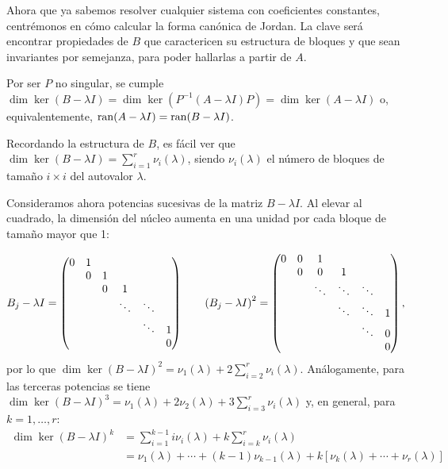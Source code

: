 \documentclass[../ecuaciones_diferenciales.tex]{subfiles}
\begin{document}
Ahora que ya sabemos resolver cualquier sistema con coeficientes constantes,
centrémonos en cómo calcular la forma canónica de Jordan. La clave será
encontrar propiedades de \(B\) que caractericen su estructura de bloques y que
sean invariantes por semejanza, para poder hallarlas a partir de \(A\).

Por ser \(P\) no singular, se cumple \(\dim \ker (B - \lambda I) = \dim \ker
(P^{-1}(A - \lambda I)P) = \dim \ker (A - \lambda I)\) o, equivalentemente,
\(\operatorname{ran} (A - \lambda I) = \operatorname{ran} (B - \lambda I)\).

Recordando la estructura de \(B\), es fácil ver que
\(\dim \ker (B - \lambda I) = \sum_{i=1}^r \nu_i(\lambda)\), siendo
\(\nu_i(\lambda)\) el número de bloques de tamaño \(i \times i\) del autovalor
\(\lambda\).

Consideramos ahora potencias sucesivas de la matriz \(B - \lambda I\). Al
elevar al cuadrado, la dimensión del núcleo aumenta en una unidad por cada
bloque de tamaño mayor que 1:

\[
	B_j - \lambda I =
	\begin{pmatrix}0 & 1 &   &        &        &   \\
		& 0 & 1 &        &        &   \\
		&   & 0 & 1      &        &   \\
		&   &   & \ddots & \ddots &   \\
		&   &   &        & \ddots & 1 \\
		&   &   &        &        & 0 \\\end{pmatrix} \qquad
	{(B_j - \lambda I)}^2 =
	\begin{pmatrix}0 & 0 & 1      &        &        &   \\
		& 0 & 0      & 1      &        &   \\
		&   & \ddots & \ddots & \ddots &   \\
		&   &        & \ddots & \ddots & 1 \\
		&   &        &        & \ddots & 0 \\
		&   &        &        &        & 0 \\\end{pmatrix},
\]
por lo que
\(\dim \ker {(B - \lambda I)}^2 = \nu_1(\lambda) + 2 \sum_{i=2}^r
\nu_i(\lambda)\). Análogamente, para las terceras potencias se tiene
\(\dim \ker {(B - \lambda I)}^3 = \nu_1(\lambda) + 2\nu_2(\lambda) + 3
\sum_{i=3}^r \nu_i(\lambda)\) y, en general, para \(k = 1, \dots, r\):
\begin{align*}
	\dim \ker {(B - \lambda I)}^k & = \sum_{i=1}^{k-1} i \nu_i(\lambda) + k
	\sum_{i=k}^r \nu_i(\lambda)                                                         \\
	                            & = \nu_1(\lambda) + \cdots + (k-1)\nu_{k-1}(\lambda) +
	k[\nu_k(\lambda) + \cdots + \nu_r(\lambda)]
\end{align*}
\end{document}

